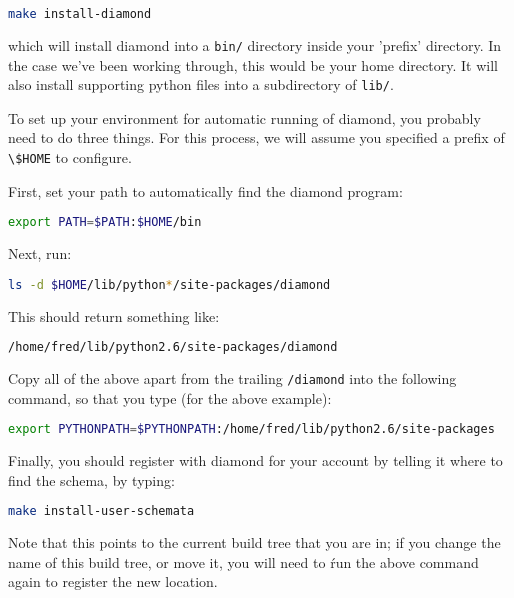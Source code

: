 \begin{lstlisting}[language=Bash]
make install-diamond
\end{lstlisting}

which will install diamond into a \lstinline[language=Bash]+bin/+ directory
inside your 'prefix' directory. In the case we've been working through, this
would be your home directory. It will also install supporting python files into
a subdirectory of \lstinline[language=Bash]+lib/+.

To set up your environment for automatic running of diamond, you probably need
to do three things. For this process, we will assume you specified a prefix of
\lstinline[language=Bash]+\$HOME+ to configure.

First, set your path to automatically find the diamond program:

\begin{lstlisting}[language=Bash]
export PATH=$PATH:$HOME/bin
\end{lstlisting}

Next, run:

\begin{lstlisting}[language=Bash]
ls -d $HOME/lib/python*/site-packages/diamond
\end{lstlisting}

This should return something like:

\begin{lstlisting}[language=Bash]
/home/fred/lib/python2.6/site-packages/diamond
\end{lstlisting}

Copy all of the above apart from the trailing
\lstinline[language=Bash]+/diamond+ into the following command, so that you
type (for the above example):

\begin{lstlisting}[language=Bash]
export PYTHONPATH=$PYTHONPATH:/home/fred/lib/python2.6/site-packages
\end{lstlisting}

Finally, you should register \fluidity with diamond for your account by
telling it where to find the \fluidity schema, by typing:

\begin{lstlisting}[language=Bash]
make install-user-schemata
\end{lstlisting}

Note that this points to the current build tree that you are in; if you change
the name of this build tree, or move it, you will need to ŕun the above command
again to register the new location.

